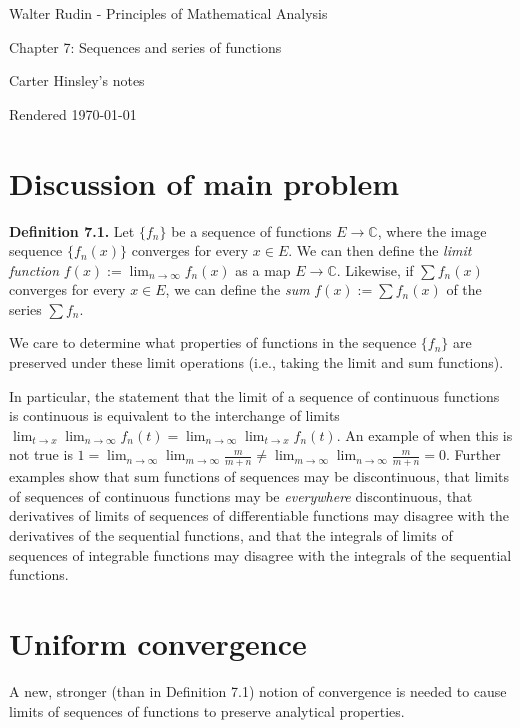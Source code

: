 \documentclass[a4paper]{article}
\newcommand{\C}{\mathbb{C}}
\begin{document}
\begin{center}
\LARGE{Walter Rudin - Principles of Mathematical Analysis}

\Large{Chapter 7: Sequences and series of functions}

\large{Carter Hinsley's notes}

Rendered \today
\end{center}

\section{Discussion of main problem}

\textbf{Definition 7.1.} Let $\{f_n\}$ be a sequence of functions $E \to \C$, where the image sequence $\{f_n(x)\}$ converges for every $x \in E$. We can then define the \emph{limit function} $\displaystyle f(x) := \lim_{n\to\infty} f_n(x)$ as a map $E \to \C$. Likewise, if $\sum f_n(x)$ converges for every $x \in E$, we can define the \emph{sum} $\displaystyle f(x) := \sum f_n(x)$ of the series $\sum f_n$.

We care to determine what properties of functions in the sequence $\{f_n\}$ are preserved under these limit operations (i.e., taking the limit and sum functions).

In particular, the statement that the limit of a sequence of continuous functions is continuous is equivalent to the interchange of limits $\displaystyle \lim_{t \to x} \lim_{n \to \infty} f_n(t) = \lim_{n \to \infty} \lim_{t \to x} f_n(t)$. An example of when this is not true is $\displaystyle 1 = \lim_{n \to \infty} \lim_{m \to \infty} \frac{m}{m + n} \neq \lim_{m \to \infty} \lim_{n \to \infty} \frac{m}{m + n} = 0$. Further examples show that sum functions of sequences may be discontinuous, that limits of sequences of continuous functions may be \emph{everywhere} discontinuous, that derivatives of limits of sequences of differentiable functions may disagree with the derivatives of the sequential functions, and that the integrals of limits of sequences of integrable functions may disagree with the integrals of the sequential functions.

\section{Uniform convergence}

A new, stronger (than in Definition 7.1) notion of convergence is needed to cause limits of sequences of functions to preserve analytical properties.
\end{document}

